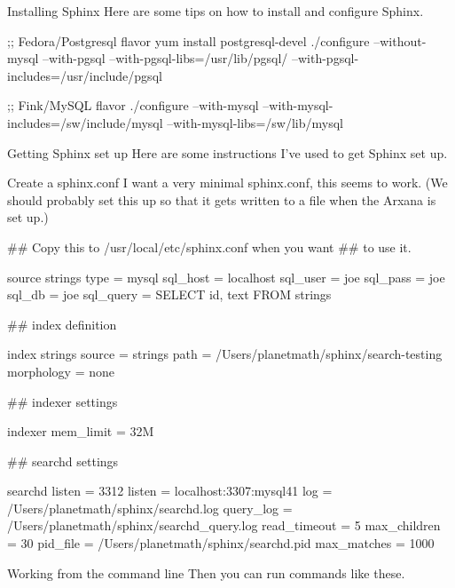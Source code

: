 \begin{notate}{Installing Sphinx}
Here are some tips on how to install and configure
Sphinx.
\end{notate}

\begin{idea}
;; Fedora/Postgresql flavor
yum install postgresql-devel
./configure --without-mysql
  --with-pgsql
  --with-pgsql-libs=/usr/lib/pgsql/
  --with-pgsql-includes=/usr/include/pgsql

;; Fink/MySQL flavor
./configure --with-mysql
  --with-mysql-includes=/sw/include/mysql
  --with-mysql-libs=/sw/lib/mysql
\end{idea}

\begin{notate}{Getting Sphinx set up} \label{sphinx-setup}
Here are some instructions I've used to get Sphinx set
up.
\end{notate}

\begin{notate}{Create a sphinx.conf}
I want a very minimal sphinx.conf, this seems to work.
(We should probably set this up so that it gets written
to a file when the Arxana is set up.)
\end{notate}

\begin{idea}
## Copy this to /usr/local/etc/sphinx.conf when you want
## to use it.

source strings
{
 type            = mysql
 sql_host        = localhost
 sql_user        = joe
 sql_pass        = joe
 sql_db          = joe
 sql_query       = SELECT id, text FROM strings
}

## index definition

index strings
{
 source          = strings
 path            = /Users/planetmath/sphinx/search-testing
 morphology      = none
}

## indexer settings

indexer
{
 mem_limit       = 32M
}

## searchd settings

searchd
{
 listen          = 3312
 listen          = localhost:3307:mysql41
 log             = /Users/planetmath/sphinx/searchd.log
 query_log       = /Users/planetmath/sphinx/searchd_query.log
 read_timeout    = 5
 max_children    = 30
 pid_file        = /Users/planetmath/sphinx/searchd.pid
 max_matches     = 1000
}
\end{idea}

\begin{notate}{Working from the command line}
Then you can run commands like these.
\end{notate}

